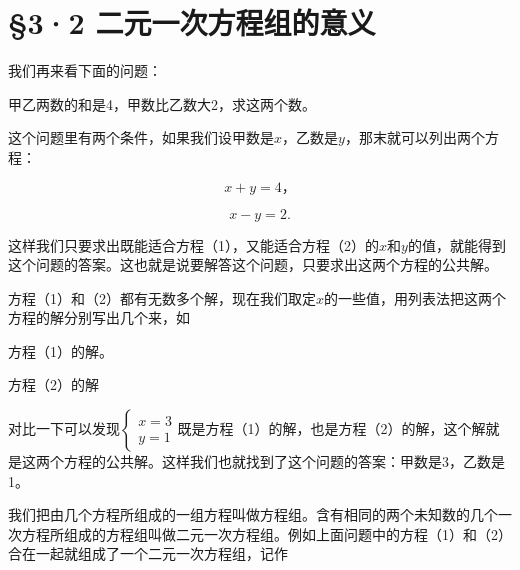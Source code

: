 \section{§3·2 二元一次方程组的意义}

我们再来看下面的问题：

甲乙两数的和是4，甲数比乙数大2，求这两个数。

这个问题里有两个条件，如果我们设甲数是\(x\)，乙数是\(y\)，那末就可以列出两个方程：

\[
x + y = 4\text{，} \tag{1}
\]

\[
x - y = 2. \tag{2}
\]

这样我们只要求出既能适合方程（1），又能适合方程（2）的\(x\)和\(y\)的值，就能得到这个问题的答案。这也就是说要解答这个问题，只要求出这两个方程的公共解。

方程（1）和（2）都有无数多个解，现在我们取定\(x\)的一些值，用列表法把这两个方程的解分别写出几个来，如

方程（1）的解。

{\centering
\footnotesize\setlength{\tabcolsep}{2.6pt}%
\par
}

方程（2）的解

{\centering
\footnotesize\setlength{\tabcolsep}{2.6pt}%
\par
}

对比一下可以发现\(\left\{ \begin{array}{l} x = 3 \\ y = 1 \end{array} \right.\)既是方程（1）的解，也是方程（2）的解，这个解就是这两个方程的公共解。这样我们也就找到了这个问题的答案：甲数是3，乙数是1。

我们把由几个方程所组成的一组方程叫做方程组。含有相同的两个未知数的几个一次方程所组成的方程组叫做二元一次方程组。例如上面问题中的方程（1）和（2）合在一起就组成了一个二元一次方程组，记作


